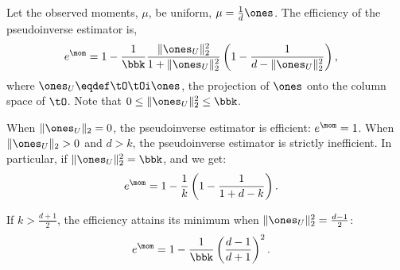 \begin{lemma}
  Let the observed moments, $\mu$, be uniform, $\mu = \frac{1}{d} \ones$. 
  The efficiency of the pseudoinverse estimator is, 
  \begin{align}
    e^\mom &= 
    1 - \frac{1}{\bbk}\frac{\|\ones_U\|_2^2}{1 + \|\ones_U\|_2^2} \left( 1 - \frac{1}{d - \|\ones_U\|_2^2} \right),
  \end{align}
  where $\ones_U \eqdef \tO\tOi \ones$, the projection of $\ones$ onto
  the column space of $\tO$. Note that $0 \le \|\ones_U\|^2_2 \le \bbk$.

  When $\|\ones_U\|_2 = 0$, the pseudoinverse estimator is efficient:
  $e^\mom = 1$. When $\|\ones_U\|_2 > 0$ and $d > k$, the pseudoinverse
  estimator is strictly inefficient. 
  In particular, if $\|\ones_U\|^2_2
    = \bbk$, and we get:
    \begin{align}
      e^\mom 
      &= 1 - \frac{1}{k} \left(1 - \frac{1}{1 + d - k} \right).
    \end{align}

    If $k > \frac{d+1}{2}$, the efficiency attains its minimum when
    $\|\ones_U\|^2_2 = \frac{d-1}{2}$:
  \begin{align*}
    e^\mom 
    &= 1 - \frac{1}{\bbk} \left( \frac{d-1}{d+1} \right)^2.
  \end{align*}
\end{lemma}
